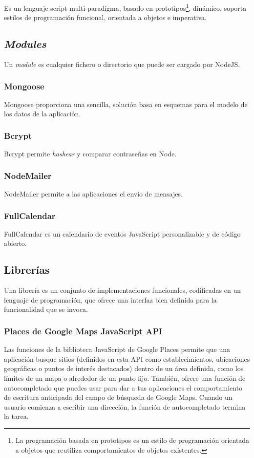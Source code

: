 Es un lenguaje script multi-paradigma, basado en prototipos\footnote{La programación basada en prototipos es un estilo de programación orientada a objetos que reutiliza comportamientos de objetos existentes.}, dinámico, soporta estilos de programación funcional, orientada a objetos e imperativa\cite{javascript_mozilla}.


\subsection{	\textit{Modules}}
Un \textit{module} es cualquier fichero o directorio que puede ser cargado por NodeJS. 


\subsubsection{Mongoose}
Mongoose proporciona una sencilla, solución basa en esquemas para el modelo de los datos de la aplicación\cite{mongoose}.


\subsubsection{Bcrypt}
Bcrypt permite \textit{hashear} y comparar contraseñas en Node.


\subsubsection{NodeMailer}
NodeMailer permite a las aplicaciones el envío de mensajes.


\subsubsection{FullCalendar}
FullCalendar es un calendario de eventos JavaScript personalizable y de código abierto\cite{fullcalendar}.


\subsection{Librerías}
Una librería es un conjunto de implementaciones funcionales, codificadas en un lenguaje de programación, que ofrece una interfaz bien definida para la funcionalidad que se invoca.


\subsubsection{Places de Google Maps JavaScript API}
Las funciones de la biblioteca JavaScript de Google Places permite que una aplicación busque sitios (definidos en esta API como establecimientos, ubicaciones geográficas o puntos de interés destacados) dentro de un área definida, como los límites de un mapa o alrededor de un punto fijo. También, ofrece una función de autocompletado que puedes usar para dar a tus aplicaciones el comportamiento de escritura anticipada del campo de búsqueda de Google Maps. Cuando un usuario comienza a escribir una dirección, la función de autocompletado termina la tarea\cite{google_api}.


